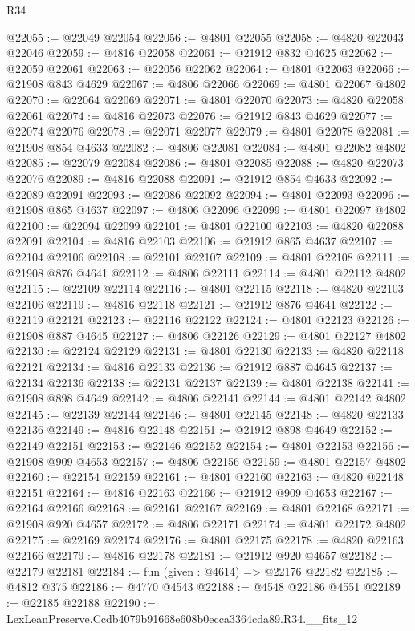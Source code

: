\begin{lexlean}{R34}
\begin{coremodule}
@22055 := @22049 @22054
@22056 := @4801 @22055
@22058 := @4820 @22043 @22046
@22059 := @4816 @22058
@22061 := @21912 @832 @4625
@22062 := @22059 @22061
@22063 := @22056 @22062
@22064 := @4801 @22063
@22066 := @21908 @843 @4629
@22067 := @4806 @22066
@22069 := @4801 @22067 @4802
@22070 := @22064 @22069
@22071 := @4801 @22070
@22073 := @4820 @22058 @22061
@22074 := @4816 @22073
@22076 := @21912 @843 @4629
@22077 := @22074 @22076
@22078 := @22071 @22077
@22079 := @4801 @22078
@22081 := @21908 @854 @4633
@22082 := @4806 @22081
@22084 := @4801 @22082 @4802
@22085 := @22079 @22084
@22086 := @4801 @22085
@22088 := @4820 @22073 @22076
@22089 := @4816 @22088
@22091 := @21912 @854 @4633
@22092 := @22089 @22091
@22093 := @22086 @22092
@22094 := @4801 @22093
@22096 := @21908 @865 @4637
@22097 := @4806 @22096
@22099 := @4801 @22097 @4802
@22100 := @22094 @22099
@22101 := @4801 @22100
@22103 := @4820 @22088 @22091
@22104 := @4816 @22103
@22106 := @21912 @865 @4637
@22107 := @22104 @22106
@22108 := @22101 @22107
@22109 := @4801 @22108
@22111 := @21908 @876 @4641
@22112 := @4806 @22111
@22114 := @4801 @22112 @4802
@22115 := @22109 @22114
@22116 := @4801 @22115
@22118 := @4820 @22103 @22106
@22119 := @4816 @22118
@22121 := @21912 @876 @4641
@22122 := @22119 @22121
@22123 := @22116 @22122
@22124 := @4801 @22123
@22126 := @21908 @887 @4645
@22127 := @4806 @22126
@22129 := @4801 @22127 @4802
@22130 := @22124 @22129
@22131 := @4801 @22130
@22133 := @4820 @22118 @22121
@22134 := @4816 @22133
@22136 := @21912 @887 @4645
@22137 := @22134 @22136
@22138 := @22131 @22137
@22139 := @4801 @22138
@22141 := @21908 @898 @4649
@22142 := @4806 @22141
@22144 := @4801 @22142 @4802
@22145 := @22139 @22144
@22146 := @4801 @22145
@22148 := @4820 @22133 @22136
@22149 := @4816 @22148
@22151 := @21912 @898 @4649
@22152 := @22149 @22151
@22153 := @22146 @22152
@22154 := @4801 @22153
@22156 := @21908 @909 @4653
@22157 := @4806 @22156
@22159 := @4801 @22157 @4802
@22160 := @22154 @22159
@22161 := @4801 @22160
@22163 := @4820 @22148 @22151
@22164 := @4816 @22163
@22166 := @21912 @909 @4653
@22167 := @22164 @22166
@22168 := @22161 @22167
@22169 := @4801 @22168
@22171 := @21908 @920 @4657
@22172 := @4806 @22171
@22174 := @4801 @22172 @4802
@22175 := @22169 @22174
@22176 := @4801 @22175
@22178 := @4820 @22163 @22166
@22179 := @4816 @22178
@22181 := @21912 @920 @4657
@22182 := @22179 @22181
@22184 := fun (given : @4614) => @22176 @22182
@22185 := @4812 @375
@22186 := @4770 @4543
@22188 := @4548 @22186 @4551
@22189 := @22185 @22188
@22190 := LexLeanPreserve.Ccdb4079b91668e608b0ecca3364cda89.R34.__fits_12

\end{coremodule}
\end{lexlean}
